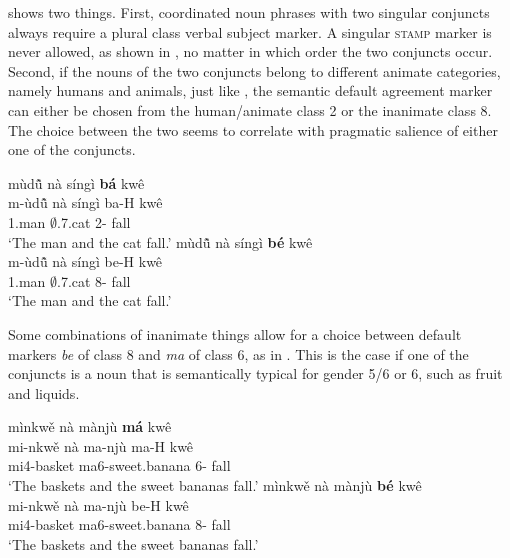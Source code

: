  shows two things. First, coordinated noun phrases with two singular conjuncts always require a plural class verbal subject marker. A singular \textsc{stamp} marker is never allowed, as shown in , no matter in which order the two conjuncts occur. Second, if the nouns of the two conjuncts belong to different animate categories, namely humans and animals, just like , the semantic default agreement marker can either be chosen from the human/animate class 2 or the inanimate class 8. The choice between the two seems to correlate with pragmatic salience of either one of the conjuncts. 

\ea \label{resol3}
\ea  \label{resol3a}
  \glll mùdũ̂ nà síngì {\bfseries bá} kwê\\
  m-ùdũ̂ nà síngì ba-H kwê\\
  {\N}1.man {\COM} $\emptyset$.7.cat 2-{\PRS} fall\\ 
 \trans `The man and the cat fall.' 
\ex  \label{resol3b}
  \glll mùdũ̂ nà síngì {\bfseries bé} kwê\\
  m-ùdũ̂ nà síngì be-H kwê\\
  {\N}1.man {\COM} $\emptyset$.7.cat 8-{\PRS} fall\\ 
   \trans `The man and the cat fall.' 
\z
\z

Some combinations of inanimate things allow for a choice between default markers {\itshape be} of class 8 and {\itshape ma} of class 6, as in . This is the case if one of the conjuncts is a noun that is semantically typical for gender 5/6 or 6, such as fruit and liquids. 

\ea \label{resol4}
\ea  \label{resol4a}
  \glll mìnkwě nà mànjù {\bfseries má} kwê\\
  mi-nkwě nà ma-njù ma-H kwê\\
mi4-basket {\COM} ma6-sweet.banana 6-{\PRS} fall\\
  \trans `The baskets and the sweet bananas fall.' 
\ex  \label{resol4b}
  \glll mìnkwě nà mànjù {\bfseries bé} kwê\\ 
  mi-nkwě nà ma-njù be-H kwê\\
mi4-basket {\COM} ma6-sweet.banana 8-{\PRS} fall\\
   \trans `The baskets and the sweet bananas fall.' 
\z
\z


